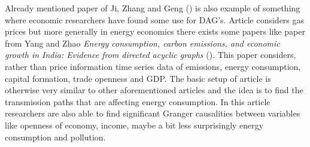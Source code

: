 \documentclass[main=english,12pt,a4paper,pdftex,econ,utf8]{aaltothesis}
\begin{document}
Already mentioned paper of Ji, Zhang and Geng (\cite{Ji2018}) is also example of something where economic researchers have found some use for DAG's. Article considers gas prices but more generally in energy economics there exists some papers like paper from Yang and Zhao \textit{Energy consumption, carbon emissions, and economic growth in India: Evidence from directed acyclic graphs} (\cite{Yang2014}). This paper considers, rather than price information time series data of emissions, energy consumption, capital formation, trade openness and GDP. The basic setup of article is otherwise very similar to other aforementioned articles and the idea is to find the transmission paths that are affecting energy consumption. In this article researchers are also able to find significant Granger causalities between variables like openness of economy, income, maybe a bit less surprisingly energy consumption and pollution.
\end{document}
